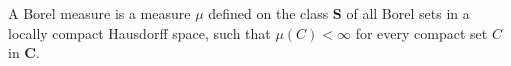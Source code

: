 A Borel measure is a measure $\mu$ defined on the class $\mathbf{S}$ of all Borel sets in a locally compact Hausdorff space, such that $\mu(C) < \infty$ for every compact set $C$ in $\mathbf{C}$.
